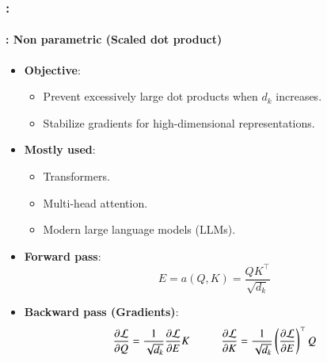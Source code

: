 \documentclass[xcolor=table]{beamer}
\begin{document}
	\begin{frame}
		\frametitle{\insertshortsubtitle: \insertsection}
		\framesubtitle{\insertsubsection: Non parametric (Scaled dot product)}
		
		\begin{itemize}
			\item \textbf{Objective}:
			\begin{itemize}
				\item Prevent excessively large dot products when $d_k$ increases.
				\item Stabilize gradients for high-dimensional representations.
			\end{itemize}
			
			\item \textbf{Mostly used}:
			\begin{itemize}
				\item Transformers.
				\item Multi-head attention.
				\item Modern large language models (LLMs).
			\end{itemize}
			
			\item \textbf{Forward pass}:
			\[E = a(Q, K) = \frac{Q K^\top}{\sqrt{d_k}}\]
			
			\item \textbf{Backward pass (Gradients)}:
			\[
			\frac{\partial \mathcal{L}}{\partial Q}
			=
			\frac{1}{\sqrt{d_k}}
			\frac{\partial \mathcal{L}}{\partial E} K
			\hskip1cm
			\frac{\partial \mathcal{L}}{\partial K}
			=
			\frac{1}{\sqrt{d_k}}
			\left(
			\frac{\partial \mathcal{L}}{\partial E}
			\right)^\top Q
			\]
			
		\end{itemize}
		
	\end{frame}
	
\end{document}
